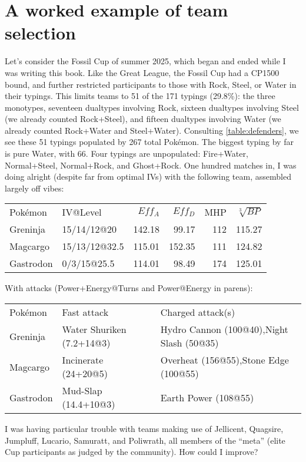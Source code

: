 \chapter{A worked example of team selection}
\label{chap:example}

Let's consider the Fossil Cup of summer 2025, which began and ended while I was writing this book.
Like the Great League, the Fossil Cup had a CP1500 bound, and further
  restricted participants to those with Rock, Steel, or Water in their typings.
This limits teams to 51 of the 171 typings (29.8\%): the three monotypes, seventeen dualtypes
 involving Rock, sixteen dualtypes involving Steel (we already counted Rock+Steel), and
 fifteen dualtypes involving Water (we already counted Rock+Water and Steel+Water).
Consulting \autoref{table:defenders}, we see these 51 typings populated by 267 total Pokémon.
The biggest typing by far is pure Water, with 66.
Four typings are unpopulated: Fire+Water, Normal+Steel, Normal+Rock, and Ghost+Rock.
One hundred matches in, I was doing alright (despite far from optimal IVs)
  with the following team, assembled largely off vibes:
\begin{center}
  \begin{tabular}{llrrrr}
    Pokémon & IV@Level & $Eff_A$ & $Eff_D$ & MHP & $\sqrt[3]{BP}$\\
    \Midrule
    Greninja & 15/14/12@20 & 142.18 & 99.17 & 112 & 115.27 \\
    Magcargo & 15/13/12@32.5 & 115.01 & 152.35 & 111 & 124.82 \\
    Gastrodon & 0/3/15@25.5 & 114.01 & 98.49 & 174 & 125.01 \\
  \end{tabular}
\end{center}
With attacks (Power+Energy@Turns and Power@Energy in parens):
\begin{center}
  \begin{tabular}{llp{}}
    Pokémon & Fast attack & Charged attack(s)\\
    \Midrule
    Greninja & Water Shuriken (7.2+14@3) & Hydro Cannon (100@40),\newline Night Slash (50@35)\\
    Magcargo & Incinerate (24+20@5) & Overheat (156@55),\newline Stone Edge (100@55)\\
    Gastrodon & Mud-Slap (14.4+10@3) & Earth Power (108@55)\\
  \end{tabular}
\end{center}
I was having particular trouble with teams making use of Jellicent, Quagsire,
  Jumpluff, Lucario, Samuratt, and Poliwrath, all members of the ``meta'' (elite Cup participants
  as judged by the community).
How could I improve?

